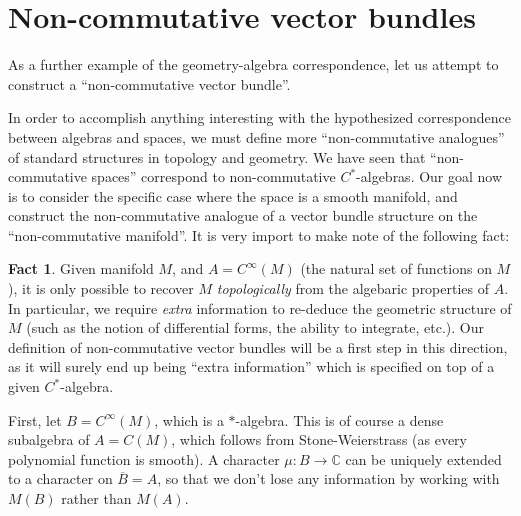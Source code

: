 \documentclass[aps,pra,showpacs,notitlepage,onecolumn,superscriptaddress,nofootinbib]{revtex4-1}
\theoremstyle{definition}
\newtheorem{fact}{Fact}[section]
\begin{document}
\section{Non-commutative vector bundles}

\noindent As a further example of the geometry-algebra correspondence, let us attempt to construct a ``non-commutative vector bundle''.
\newline

\noindent In order to accomplish anything interesting with the hypothesized correspondence between algebras and spaces, we must define more ``non-commutative analogues''
of standard structures in topology and geometry. We have seen that ``non-commutative spaces'' correspond to non-commutative $C^{*}$-algebras. Our goal now
is to consider the specific case where the space is a smooth manifold, and construct the non-commutative analogue of a vector bundle structure on the ``non-commutative manifold''.
It is very import to make note of the following fact:

\begin{fact}
  Given manifold $M$, and $A = C^{\infty}(M)$ (the natural set of functions on $M$), it is only possible to recover $M$ \emph{topologically} from the algebaric properties of $A$.
  In particular, we require \emph{extra} information to re-deduce the geometric structure of $M$ (such as the notion of differential forms, the ability to integrate, etc.).
  Our definition of non-commutative vector bundles will be a first step in this direction, as it will surely end up being ``extra information'' which is specified on
  top of a given $C^{*}$-algebra.
\end{fact}

First, let $B = C^{\infty}(M)$, which is a $*$-algebra. This is of course a dense subalgebra of $A = C(M)$, which follows from Stone-Weierstrass (as every polynomial
function is smooth). A character $\mu : B \rightarrow \mathbb{C}$ can be uniquely extended to a character on $\overline{B} = A$, so that we don't lose any
information by working with $M(B)$ rather than $M(A)$.
\end{document}
